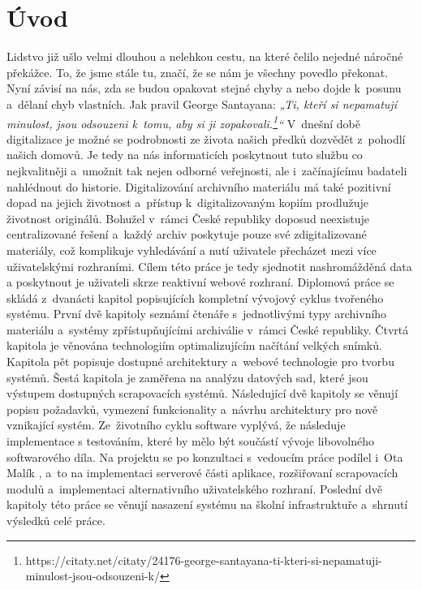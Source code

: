 \chapter{Úvod}
Lidstvo již ušlo velmi dlouhou a nelehkou cestu, na které čelilo nejedné náročné překážce. To, že jsme stále tu, značí, že se nám je všechny povedlo překonat. Nyní závisí na nás, zda se budou opakovat stejné chyby a nebo dojde k~posunu a~dělaní chyb vlastních. Jak pravil George Santayana: \textit{„Ti, kteří si nepamatují minulost, jsou odsouzeni k~tomu, aby si ji zopakovali.\footnote{https://citaty.net/citaty/24176-george-santayana-ti-kteri-si-nepamatuji-minulost-jsou-odsouzeni-k/}“} V~dnešní době digitalizace je možné se podrobnosti ze života našich předků dozvědět z~pohodlí našich domovů. Je tedy na nás informaticích poskytnout tuto službu co nejkvalitněji a~umožnit tak nejen odborné veřejnosti, ale i~začínajícímu badateli nahlédnout do historie. Digitalizování archivního materiálu má také pozitivní dopad na jejich životnost a~přístup k~digitalizovaným kopiím prodlužuje životnost originálů. Bohužel v~rámci České republiky doposud neexistuje centralizované řešení a~každý archiv poskytuje pouze své zdigitalizované materiály, což komplikuje vyhledávání a nutí uživatele přecházet mezi více uživatelskými rozhraními. Cílem této práce je tedy sjednotit nashromážděná data a poskytnout je uživateli skrze reaktivní webové rozhraní. 
\newpara
Diplomová práce se skládá z~dvanácti kapitol popisujících kompletní vývojový cyklus tvořeného systému. První dvě kapitoly seznámí čtenáře s~jednotlivými typy archivního materiálu a~systémy zpřístupňujícími archiválie v~rámci České republiky. Čtvrtá kapitola je věnována technologiím optimalizujícím načítání velkých snímků. Kapitola pět popisuje dostupné architektury a~webové technologie pro tvorbu systémů. Šestá kapitola je zaměřena na analýzu datových sad, které jsou výstupem dostupných scrapovacích systémů. Následující dvě kapitoly se věnují popisu požadavků, vymezení funkcionality a~návrhu architektury pro nově vznikající systém. Ze~životního cyklu software vyplývá, že následuje implementace s testováním, které by mělo být součástí vývoje libovolného softwarového díla. Na projektu se po konzultaci s~vedoucím práce podílel i~Ota Malík \cite{Malik}, a~to na implementaci serverové části aplikace, rozšiřovaní scrapovacích modulů a~implementaci alternativního uživatelského rozhraní. Poslední dvě kapitoly této práce se věnují nasazení systému na školní infrastruktuře a~shrnutí výsledků celé práce.